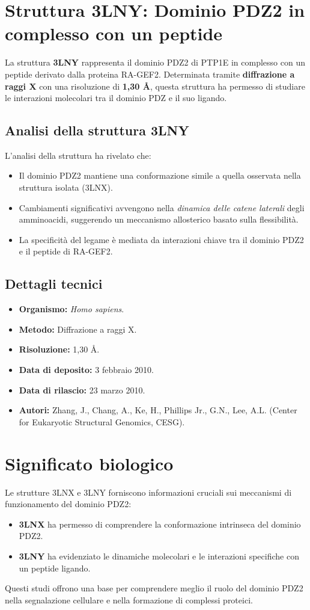 \documentclass[Lau,binding=0.6cm,oneside,noexaminfo]{sapthesis}
\begin{document}
\section{Struttura 3LNY: Dominio PDZ2 in complesso con un peptide}
La struttura \textbf{3LNY} rappresenta il dominio PDZ2 di PTP1E in complesso con un peptide derivato dalla proteina RA-GEF2. Determinata tramite \textbf{diffrazione a raggi X} con una risoluzione di \textbf{1,30 Å}, questa struttura ha permesso di studiare le interazioni molecolari tra il dominio PDZ e il suo ligando.

\subsection{Analisi della struttura 3LNY}
L'analisi della struttura ha rivelato che:
\begin{itemize}
    \item Il dominio PDZ2 mantiene una conformazione simile a quella osservata nella struttura isolata (3LNX).
    \item Cambiamenti significativi avvengono nella \textit{dinamica delle catene laterali} degli amminoacidi, suggerendo un meccanismo allosterico basato sulla flessibilità.
    \item La specificità del legame è mediata da interazioni chiave tra il dominio PDZ2 e il peptide di RA-GEF2.
\end{itemize}

\subsection{Dettagli tecnici}
\begin{itemize}
    \item \textbf{Organismo:} \textit{Homo sapiens}.
    \item \textbf{Metodo:} Diffrazione a raggi X.
    \item \textbf{Risoluzione:} 1,30 Å.
    \item \textbf{Data di deposito:} 3 febbraio 2010.
    \item \textbf{Data di rilascio:} 23 marzo 2010.
    \item \textbf{Autori:} Zhang, J., Chang, A., Ke, H., Phillips Jr., G.N., Lee, A.L. (Center for Eukaryotic Structural Genomics, CESG).
\end{itemize}

\section{Significato biologico}
Le strutture 3LNX e 3LNY forniscono informazioni cruciali sui meccanismi di funzionamento del dominio PDZ2:
\begin{itemize}
    \item \textbf{3LNX} ha permesso di comprendere la conformazione intrinseca del dominio PDZ2.
    \item \textbf{3LNY} ha evidenziato le dinamiche molecolari e le interazioni specifiche con un peptide ligando.
\end{itemize}
Questi studi offrono una base per comprendere meglio il ruolo del dominio PDZ2 nella segnalazione cellulare e nella formazione di complessi proteici.
\end{document}

